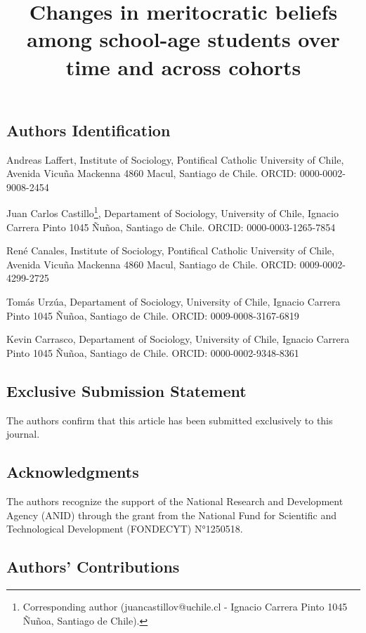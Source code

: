 \documentclass[
  12pt,
  letterpaper,
  DIV=11,
  numbers=noendperiod]{scrartcl}
\title{Changes in meritocratic beliefs among school-age students over
time and across cohorts}
\author{}
\date{}
\begin{document}
\maketitle


\subsection{Authors Identification}\label{authors-identification}

Andreas Laffert, Institute of Sociology, Pontifical Catholic University
of Chile, Avenida Vicuña Mackenna 4860 Macul, Santiago de Chile. ORCID:
0000-0002-9008-2454

Juan Carlos Castillo\footnote{Corresponding author
  (juancastillov@uchile.cl - Ignacio Carrera Pinto 1045 Ñuñoa, Santiago
  de Chile).}, Departament of Sociology, University of Chile, Ignacio
Carrera Pinto 1045 Ñuñoa, Santiago de Chile. ORCID: 0000-0003-1265-7854

René Canales, Institute of Sociology, Pontifical Catholic University of
Chile, Avenida Vicuña Mackenna 4860 Macul, Santiago de Chile. ORCID:
0009-0002-4299-2725

Tomás Urzúa, Departament of Sociology, University of Chile, Ignacio
Carrera Pinto 1045 Ñuñoa, Santiago de Chile. ORCID: 0009-0008-3167-6819

Kevin Carrasco, Departament of Sociology, University of Chile, Ignacio
Carrera Pinto 1045 Ñuñoa, Santiago de Chile. ORCID: 0000-0002-9348-8361

\subsection{Exclusive Submission
Statement}\label{exclusive-submission-statement}

The authors confirm that this article has been submitted exclusively to
this journal.

\subsection{Acknowledgments}\label{acknowledgments}

The authors recognize the support of the National Research and
Development Agency (ANID) through the grant from the National Fund for
Scientific and Technological Development (FONDECYT) N°1250518.

\subsection{Authors' Contributions}\label{authors-contributions}
\end{document}
